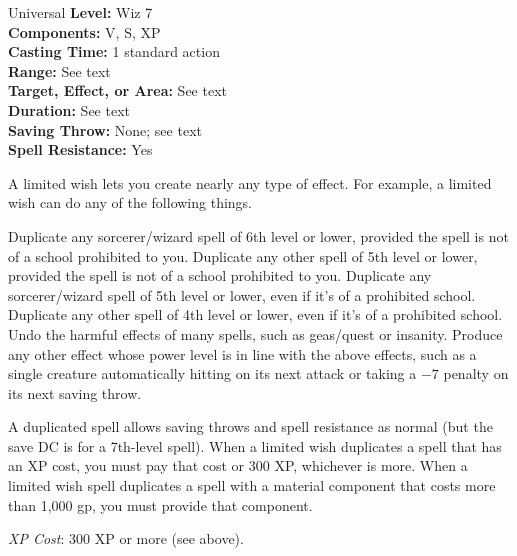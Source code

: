 {Universal}
{
	\textbf{Level:}
	Wiz 7\\
	\textbf{Components:}
	V, S, XP\\
	\textbf{Casting Time:}
	1 standard action\\
	\textbf{Range:}
	See text\\
	\textbf{Target, Effect, or Area:}
	See text\\
	\textbf{Duration:}
	See text\\
	\textbf{Saving Throw:}
	None; see text\\
	\textbf{Spell Resistance:}
	Yes\\
}
{
	A limited wish lets you create nearly any type of effect. For example, a limited wish can do any of the following things.


Duplicate any sorcerer/wizard spell of 6th level or lower, provided the spell is not of a school prohibited to you.
Duplicate any other spell of 5th level or lower, provided the spell is not of a school prohibited to you.
Duplicate any sorcerer/wizard spell of 5th level or lower, even if it's of a prohibited school.
Duplicate any other spell of 4th level or lower, even if it's of a prohibited school.
Undo the harmful effects of many spells, such as geas/quest or insanity.
Produce any other effect whose power level is in line with the above effects, such as a single creature automatically hitting on its next attack or taking a $-7$ penalty on its next saving throw.

	A duplicated spell allows saving throws and spell resistance as normal (but the save DC is for a 7th-level spell). When a limited wish duplicates a spell that has an XP cost, you must pay that cost or 300 XP, whichever is more. When a limited wish spell duplicates a spell with a material component that costs more than 1,000 gp, you must provide that component.

	\textit{XP Cost}:
	300 XP or more (see above).

}
